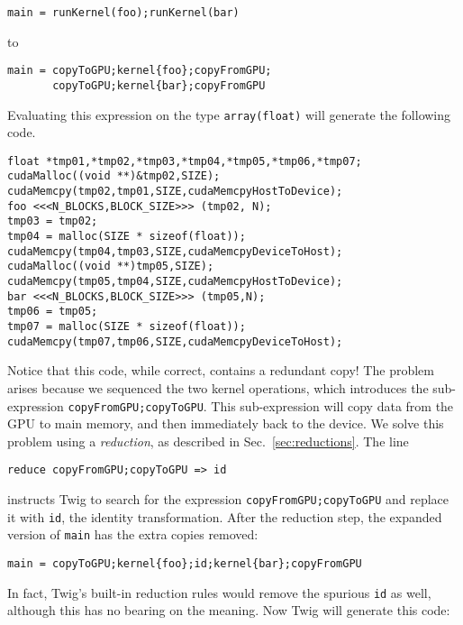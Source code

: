 \begin{verbatim}
main = runKernel(foo);runKernel(bar)
\end{verbatim}

\noindent to 

\begin{verbatim}
main = copyToGPU;kernel{foo};copyFromGPU;
       copyToGPU;kernel{bar};copyFromGPU
\end{verbatim}

Evaluating this expression on the type \texttt{array(float)} will
generate the following code.

\begin{verbatim}
float *tmp01,*tmp02,*tmp03,*tmp04,*tmp05,*tmp06,*tmp07;
cudaMalloc((void **)&tmp02,SIZE);
cudaMemcpy(tmp02,tmp01,SIZE,cudaMemcpyHostToDevice);
foo <<<N_BLOCKS,BLOCK_SIZE>>> (tmp02, N);
tmp03 = tmp02;
tmp04 = malloc(SIZE * sizeof(float));
cudaMemcpy(tmp04,tmp03,SIZE,cudaMemcpyDeviceToHost);
cudaMalloc((void **)tmp05,SIZE);
cudaMemcpy(tmp05,tmp04,SIZE,cudaMemcpyHostToDevice);
bar <<<N_BLOCKS,BLOCK_SIZE>>> (tmp05,N);
tmp06 = tmp05;
tmp07 = malloc(SIZE * sizeof(float));
cudaMemcpy(tmp07,tmp06,SIZE,cudaMemcpyDeviceToHost);
\end{verbatim}

Notice that this code, while correct, contains a redundant copy!
The problem arises because we sequenced the two kernel operations,
which introduces the sub-expression
\texttt{copyFromGPU;copyToGPU}. This sub-expression will copy data
from the GPU to main memory, and then immediately back to the
device. We solve this problem using a \emph{reduction}, as
described in Sec.~\ref{sec:reductions}. The line

\begin{verbatim}
reduce copyFromGPU;copyToGPU => id
\end{verbatim}

\noindent instructs Twig to search for the expression
\texttt{copyFromGPU;copyToGPU} and replace it with \texttt{id},
the identity transformation. After the reduction step, the
expanded version of \texttt{main} has the extra copies removed:

\begin{verbatim}
main = copyToGPU;kernel{foo};id;kernel{bar};copyFromGPU
\end{verbatim}

In fact, Twig's built-in reduction rules would remove the spurious
\texttt{id} as well, although this has no bearing on the meaning.
Now Twig will generate this code:

